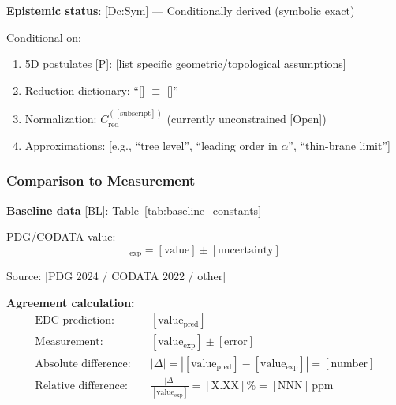 \textbf{Epistemic status}: [Dc:Sym] --- Conditionally derived (symbolic exact)

Conditional on:
\begin{enumerate}
\item 5D postulates [P]: [list specific geometric/topological assumptions]
\item Reduction dictionary: ``[] $\equiv$ []''
\item Normalization: $C_{\mathrm{red}}^{([\text{subscript}])}$ (currently unconstrained [Open])
\item Approximations: [e.g., ``tree level'', ``leading order in $\alpha$'', ``thin-brane limit'']
\end{enumerate}



\subsubsection{Comparison to Measurement}

\textbf{Baseline data} [BL]: Table~\ref{tab:baseline_constants}

PDG/CODATA value:
\begin{equation}
  [\text{quantity}]_{\text{exp}} = [\text{value}] \pm [\text{uncertainty}]
\end{equation}

Source: [PDG 2024 / CODATA 2022 / other]

\textbf{Agreement calculation:}
\begin{align}
\text{EDC prediction:} \quad &[\text{value}_{\text{pred}}] \\
\text{Measurement:} \quad &[\text{value}_{\text{exp}}] \pm [\text{error}] \\
\text{Absolute difference:} \quad &|\Delta| = |[\text{value}_{\text{pred}}] - [\text{value}_{\text{exp}}]| 
                                    = [\text{number}] \\
\text{Relative difference:} \quad &\frac{|\Delta|}{[\text{value}_{\text{exp}}]} 
                                    = [\text{X.XX}]\% = [\text{NNN}]\,\text{ppm}
\end{align}

